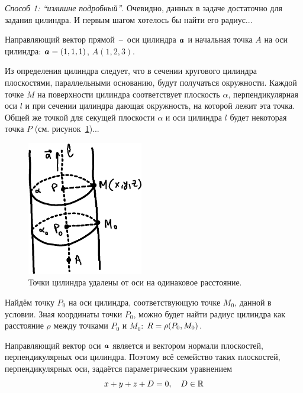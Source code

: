 \documentclass[a4paper,12pt]{article}
\begin{document}
  \begin{solution}
    \vphantom{}
    
    \emph{Способ 1: ``излишне подробный''}.
    Очевидно, данных в задаче достаточно для задания цилиндра.
    И первым шагом хотелось бы найти его радиус...
    
    Направляющий вектор прямой~--~оси цилиндра $\boldsymbol a$ и начальная точка $A$ на оси цилиндра: $\bds a \hm= (1, 1, 1)$, $A(1, 2, 3)$.
    
    Из определения цилиндра следует, что в сечении кругового цилиндра плоскостями, параллельными основанию, будут получаться окружности.
    Каждой точке $M$ на поверхности цилиндра соответствует плоскость $\alpha$, перпендикулярная оси $l$ и при сечении цилиндра дающая окружность, на которой лежит эта точка.
    Общей же точкой для секущей плоскости $\alpha$ и оси цилиндра $l$ будет некоторая точка $P$ (см. рисунок~\ref{fig:cylinder-10-38})...
    
    \begin{figure}[h]
      \centering

      \includegraphics[width=0.45\textwidth]{cylinder-10-38}
    
      \caption{Точки цилиндра удалены от оси на одинаковое расстояние.}
      \label{fig:cylinder-10-38}
    \end{figure}
    
    Найдём точку $P_0$ на оси цилиндра, соответствующую точке $M_0$, данной в условии.
    Зная координаты точки $P_0$, можно будет найти радиус цилиндра как расстояние $\rho$ между точками $P_0$ и $M_0$: $R \hm= \rho(P_0, M_0)$.
    
    Направляющий вектор оси $\boldsymbol a$ является и вектором нормали плоскостей, перпендикулярных оси цилиндра.
    Поэтому всё семейство таких плоскостей, перпендикулярных оси, задаётся параметрическим уравнением
    \begin{equation}
      \label{eq:family-of-planes}
      x + y + z + D = 0,\quad D \in \operatorname{\mathbb R}
    \end{equation}
    

\end{solution}
\end{document}
